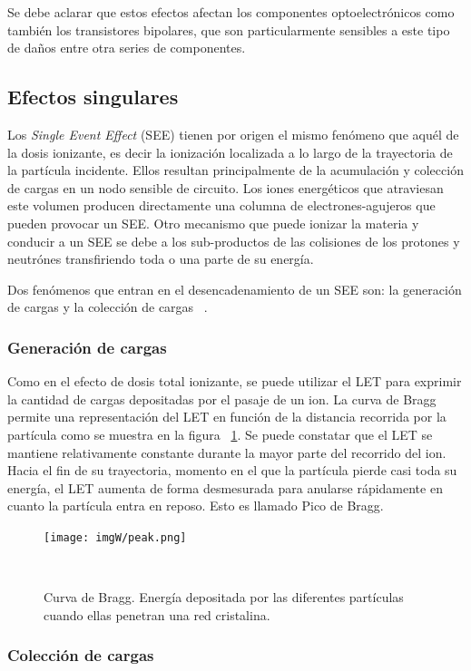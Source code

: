 \documentclass[a4paper,openright,12pt]{report}
\begin{document}
Se debe aclarar que estos efectos afectan los componentes optoelectrónicos como también los transistores bipolares, que son particularmente sensibles a este tipo de daños entre otra series de componentes.


\subsection{Efectos singulares}


Los \textit{Single Event Effect} (SEE) tienen por origen el mismo fenómeno que aquél de la dosis ionizante, es decir la ionización localizada a lo largo de la trayectoria de la partícula incidente. Ellos resultan principalmente de la acumulación y  colección de cargas en un nodo sensible de circuito. Los iones energéticos que atraviesan este volumen producen directamente una columna de electrones-agujeros que pueden provocar un SEE. Otro mecanismo que puede ionizar la materia y conducir a un SEE se debe a los sub-productos de las colisiones de los protones y  neutrónes transfiriendo toda o una parte de su energía.

Dos fenómenos que entran en el desencadenamiento de un SEE son: la generación de cargas y la colección de cargas ~\cite{duzellier2004space}.


\subsubsection{Generación de cargas}

Como en el efecto de dosis total ionizante, se puede utilizar el LET  para exprimir la cantidad de cargas depositadas por el pasaje de un ion. La curva de Bragg permite una representación del LET en función de la distancia recorrida por la partícula como se muestra en la  figura ~\ref{peak}. Se puede constatar que el LET se mantiene relativamente constante durante la mayor parte del recorrido del ion. Hacia el fin de su trayectoria,  momento  en el que la partícula pierde casi toda su energía, el LET aumenta de  forma desmesurada  para anularse rápidamente en cuanto la partícula entra en reposo. Esto es llamado Pico de Bragg. 

\begin{figure}[H]
	\centering
	\texttt{[image: imgW/peak.png]}
	\caption{Curva de Bragg. Energía depositada por las diferentes partículas cuando ellas penetran una red cristalina.  }~\cite{CERN123} 
	\label{peak}
\end{figure}

\subsubsection{Colección de cargas}
\end{document}
